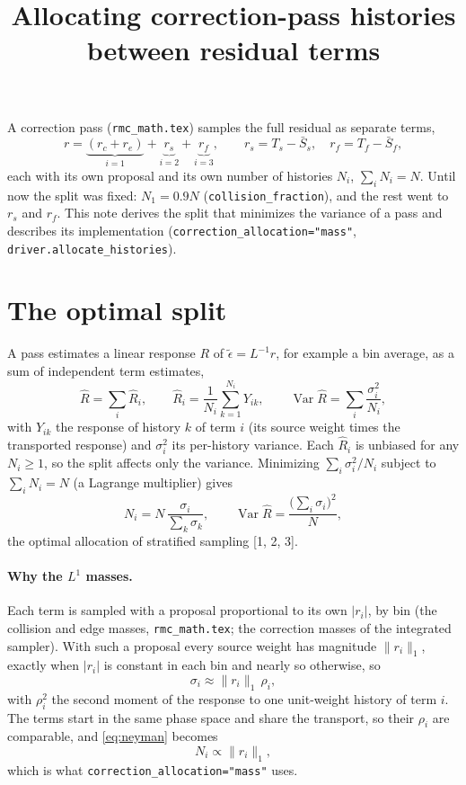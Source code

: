\documentclass[11pt]{article}
\title{Allocating correction-pass histories between residual terms}
\date{}
\newcommand{\teps}{\tilde\epsilon}
\newcommand{\Sbar}{\bar S}
\begin{document}
\maketitle

\noindent A correction pass (\texttt{rmc\_math.tex}) samples the full residual as
separate terms,
\begin{equation}
  r = \underbrace{(r_c + r_e)}_{i=1} + \underbrace{r_s}_{i=2} + \underbrace{r_f}_{i=3},
  \qquad r_s = T_s - \Sbar_s,\quad r_f = T_f - \Sbar_f ,
\end{equation}
each with its own proposal and its own number of histories $N_i$,
$\sum_i N_i = N$. Until now the split was fixed: $N_1 = 0.9N$
(\texttt{collision\_fraction}), and the rest went to $r_s$ and $r_f$. This note derives
the split that minimizes the variance of a pass and describes its implementation
(\texttt{correction\_allocation="mass"}, \texttt{driver.allocate\_histories}).

\section{The optimal split}

A pass estimates a linear response $R$ of $\teps = L^{-1}r$, for example a bin average,
as a sum of independent term estimates,
\begin{equation}
  \hat R = \sum_i \hat R_i,\qquad
  \hat R_i = \frac{1}{N_i}\sum_{k=1}^{N_i} Y_{ik},\qquad
  \operatorname{Var}\hat R = \sum_i \frac{\sigma_i^2}{N_i},
\end{equation}
with $Y_{ik}$ the response of history $k$ of term $i$ (its source weight times the
transported response) and $\sigma_i^2$ its per-history variance. Each $\hat R_i$ is
unbiased for any $N_i\ge1$, so the split affects only the variance. Minimizing
$\sum_i\sigma_i^2/N_i$ subject to $\sum_iN_i=N$ (a Lagrange multiplier) gives
\begin{equation}
  N_i = N\,\frac{\sigma_i}{\sum_k\sigma_k},\qquad
  \operatorname{Var}\hat R = \frac{\big(\sum_i\sigma_i\big)^2}{N},
  \label{eq:neyman}
\end{equation}
the optimal allocation of stratified sampling [1, 2, 3].

\paragraph{Why the $L^1$ masses.} Each term is sampled with a proposal proportional to
its own $|r_i|$, by bin (the collision and edge masses, \texttt{rmc\_math.tex}; the
correction masses of the integrated sampler). With such a proposal every source weight
has magnitude $\|r_i\|_1$, exactly when $|r_i|$ is constant in each bin and nearly so
otherwise, so
\begin{equation}
  \sigma_i \approx \|r_i\|_1\,\rho_i,
\end{equation}
with $\rho_i^2$ the second moment of the response to one unit-weight history of term
$i$. The terms start in the same phase space and share the transport, so their
$\rho_i$ are comparable, and \eqref{eq:neyman} becomes
\begin{equation}
  N_i \propto \|r_i\|_1 ,
\end{equation}
which is what \texttt{correction\_allocation="mass"} uses.
\end{document}
